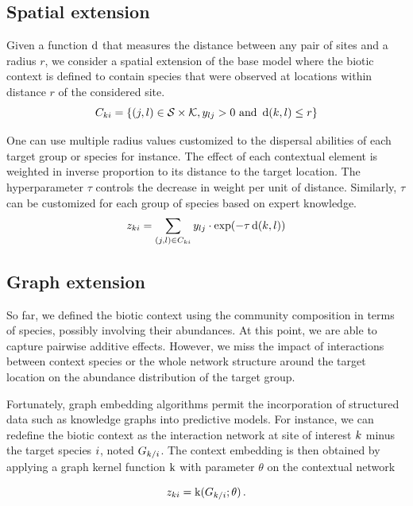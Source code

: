 \documentclass[10pt,a4paper]{article}
\begin{document}
\subsection{Spatial extension}
Given a function $\operatorname{d}$ that measures the distance between any pair of sites and a radius $r$, we consider a spatial extension of the base model where the biotic context is defined to contain species that were observed at locations within distance $r$ of the considered site.
\begin{equation*}
  C_{ki} = \{(j, l) \in \mathcal{S} \times \mathcal{K}, y_{lj} > 0 \text{ and }  \operatorname{d}(k, l) \leq r\}
\end{equation*}

One can use multiple radius values customized to the dispersal abilities of each target group or species for instance. The effect of each contextual element is weighted in inverse proportion to its distance to the target location. The hyperparameter $\tau$ controls the decrease in weight per unit of distance. Similarly, $\tau$ can be customized for each group of species based on expert knowledge.  
\begin{equation*}
  z_{ki} = \sum_{(j, l) \in C_{ki}} y_{lj} \cdot \exp(-\tau \operatorname{d}(k, l))
\end{equation*}

\subsection{Graph extension}
So far, we defined the biotic context using the community composition in terms of species, possibly involving their abundances. At this point, we are able to capture pairwise additive effects. However, we miss the impact of interactions between context species or the whole network structure around the target location on the abundance distribution of the target group. 

Fortunately, graph embedding algorithms permit the incorporation of structured data such as knowledge graphs into predictive models. For instance, we can redefine the biotic context as the interaction network at site of interest $k$ minus the target species $i$, noted $G_{k/i}$. The context embedding is then obtained by applying a graph kernel function $\operatorname{k}$ with parameter $\theta$ on the contextual network

\begin{equation*}
  z_{ki} = \operatorname{k}(G_{k/i}; \theta)\,. 
\end{equation*}


	
\end{document}
